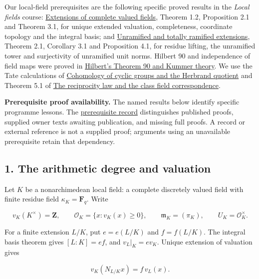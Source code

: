 \documentclass[11pt,a4paper]{article}
\begin{document}
Our local-field prerequisites are the following specific proved results
in the \emph{Local fields} course:
\href{https://kokunoyumeto.github.io/open-math-courses/courses/NT-CFT/proof-dependencies.html\#NT-LOC-04}{Extensions
of complete valued fields}, Theorem 1.2, Proposition 2.1 and Theorem
3.1, for unique extended valuation, completeness, coordinate topology
and the integral basis; and
\href{https://kokunoyumeto.github.io/open-math-courses/courses/NT-CFT/proof-dependencies.html\#NT-LOC-07}{Unramified
and totally ramified extensions}, Theorem 2.1, Corollary 3.1 and
Proposition 4.1, for residue lifting, the unramified tower and
surjectivity of unramified unit norms. Hilbert 90 and independence of
field maps were proved in
\href{../hilberts-theorem-90-and-kummer-theory.html}{Hilbert's Theorem
90 and Kummer theory}. We use the Tate calculations of
\href{../cohomology-of-cyclic-groups-and-the-herbrand-quotient.html}{Cohomology
of cyclic groups and the Herbrand quotient} and Theorem 5.1 of
\href{../the-reciprocity-law-and-the-class-field-correspondence.html}{The
reciprocity law and the class field correspondence}.

\textbf{Prerequisite proof availability.} The named results below
identify specific programme lessons. The
\href{https://kokunoyumeto.github.io/open-math-courses/courses/NT-CFT/proof-dependencies.html\#lesson-6}{prerequisite
record} distinguishes published proofs, supplied owner texts awaiting
publication, and missing full proofs. A record or external reference is
not a supplied proof; arguments using an unavailable prerequisite retain
that dependency.

\subsection{1. The arithmetic degree and
valuation}\label{the-arithmetic-degree-and-valuation}

Let \(K\) be a nonarchimedean local field: a complete discretely valued
field with finite residue field \(\kappa_K=\mathbf F_q\). Write

\[
v_K(K^\times)=\mathbf Z,\qquad
\mathcal O_K=\{x:v_K(x)\geq0\},\qquad
\mathfrak m_K=(\pi_K),\qquad U_K=\mathcal O_K^\times.
\]

For a finite extension \(L/K\), put \(e=e(L/K)\) and \(f=f(L/K)\). The
integral basis theorem gives \([L:K]=ef\), and \(v_L|_K=e v_K\). Unique
extension of valuation gives

\[
v_K(N_{L/K}x)=f\,v_L(x).
\tag{1}
\]
\end{document}
